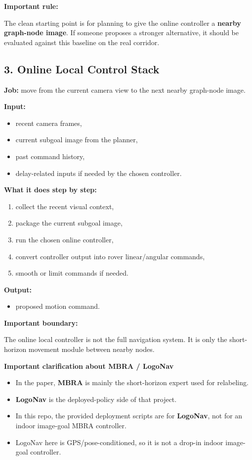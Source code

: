 \documentclass[11pt,a4paper]{article}
\begin{document}
\textbf{Important rule:}

The clean starting point is for planning to give the online controller a \textbf{nearby graph-node image}.
If someone proposes a stronger alternative, it should be evaluated against this baseline on the real corridor.

\subsection{3. Online Local Control Stack}

\textbf{Job:} move from the current camera view to the next nearby graph-node image.

\textbf{Input:}

\begin{itemize}[nosep]
  \item recent camera frames,
  \item current subgoal image from the planner,
  \item past command history,
  \item delay-related inputs if needed by the chosen controller.
\end{itemize}

\textbf{What it does step by step:}

\begin{enumerate}[nosep]
  \item collect the recent visual context,
  \item package the current subgoal image,
  \item run the chosen online controller,
  \item convert controller output into rover linear/angular commands,
  \item smooth or limit commands if needed.
\end{enumerate}

\textbf{Output:}

\begin{itemize}[nosep]
  \item proposed motion command.
\end{itemize}

\textbf{Important boundary:}

The online local controller is not the full navigation system.
It is only the short-horizon movement module between nearby nodes.

\textbf{Important clarification about MBRA / LogoNav}

\begin{itemize}[nosep]
  \item In the paper, \textbf{MBRA} is mainly the short-horizon expert used for relabeling.
  \item \textbf{LogoNav} is the deployed-policy side of that project.
  \item In this repo, the provided deployment scripts are for \textbf{LogoNav}, not for an indoor image-goal MBRA controller.
  \item LogoNav here is GPS/pose-conditioned, so it is not a drop-in indoor image-goal controller.
\end{itemize}
\end{document}
